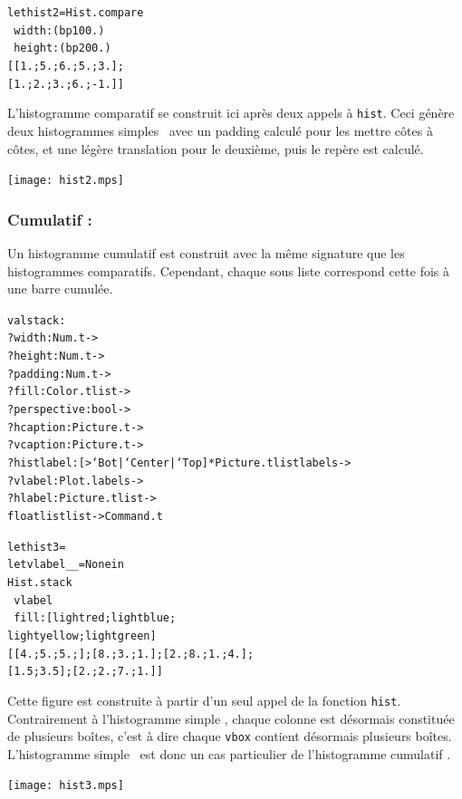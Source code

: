 \documentclass[a4paper,12pt]{article}
\begin{document}
\bigskip

\begin{minipage}{0.5\linewidth}
  \begin{alltt}
    let hist2 = Hist.compare
    ~width:(bp 100.)
    ~height:(bp 200.)
    [[1.;5.;6.;5.;3.];
      [1.;2.;3.;6.;-1.]]
  \end{alltt}
  
  L'histogramme comparatif se construit ici après deux appels à \texttt{hist}. Ceci génère deux histogrammes \og simples \fg\, avec un padding calculé pour les mettre côtes à côtes, et une légère translation pour le deuxième, puis le repère est calculé.
\end{minipage}
\begin{minipage}{0.5\linewidth}
\begin{center}
\texttt{[image: hist2.mps]}
\end{center}
\end{minipage}

\subsubsection{Cumulatif :} 
Un histogramme cumulatif est construit avec la même signature que les histogrammes comparatifs. Cependant, chaque sous liste correspond cette fois à une barre cumulée.
\begin{alltt}
  val stack :
  ?width:Num.t ->
  ?height:Num.t ->
  ?padding:Num.t ->
  ?fill:Color.t list ->
  ?perspective: bool ->
  ?hcaption:Picture.t ->
  ?vcaption:Picture.t ->
  ?histlabel:[> `Bot | `Center | `Top ] * Picture.t list labels ->
  ?vlabel:Plot.labels ->
  ?hlabel:Picture.t list -> 
  float list list -> Command.t
\end{alltt}

\bigskip

\begin{minipage}{0.5\linewidth}
  \begin{alltt}
    let hist3 =
    let vlabel _ _ = None in
    Hist.stack 
    ~vlabel
    ~fill:[lightred;lightblue;
      lightyellow;lightgreen]
    [[4.;5.;5.;]; [8.;3.;1.]; [2.;8.;1.;4.];
      [1.5;3.5];[2.;2.;7.;1.]]
  \end{alltt}
  
  Cette figure est construite à partir d'un seul appel de la fonction \texttt{hist}. Contrairement à l'histogramme \og simple \fg, chaque colonne est désormais constituée de plusieurs boîtes, c'est à dire chaque \texttt{vbox} contient désormais plusieurs boîtes. L'histogramme \og simple \fg\ est donc un cas particulier de l'histogramme \og cumulatif \fg.
\end{minipage}
\begin{minipage}{0.5\linewidth}
\begin{center}
\texttt{[image: hist3.mps]}
\end{center}
\end{minipage}
\end{document}
